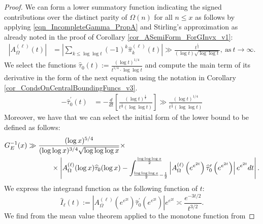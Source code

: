 \documentclass[11pt,reqno,a4letter]{article}
\numberwithin{figure}{section}
\numberwithin{table}{section}
\theoremstyle{plain}
\numberwithin{theorem}{section}
\theoremstyle{definition}
\begin{document}
\begin{proof} 
We can form a lower summatory function indicating the signed contributions over the distinct 
parity of $\Omega(n)$ for all $n \leq x$ as follows by applying 
\eqref{eqn_IncompleteGamma_PropA} and Stirling's approximation as already noted in the 
proof of Corollary \ref{cor_ASemiForm_ForGInvx_v1}: 
\begin{align} 
\label{proof_thm_GInvFunc_v0} 
\left\lvert A_{\Omega}^{(\ell)}(t) \right\rvert & = 
     \left\lvert \sum_{k \leq \log\log t} (-1)^k \widehat{\pi}_k^{(\ell)}(t) \right\rvert 
     \gg 
     \frac{t^{\frac{1}{4}}}{(\log t) \sqrt{\log\log t}}, 
     \mathrm{\ as\ } t \rightarrow \infty. 
\end{align} 
We select the functions 
$\widehat{\tau}_0(t) := \frac{(\log t)^{1/4}}{t^{1/4} \cdot \log\log t}$ and 
compute the main term of its derivative 
in the form of the next equation using 
the notation in Corollary \ref{cor_CondsOnCentralBoundingFuncs_v3}. 
\begin{align} 
\label{eqn_HatTauPrimet_summation_weight_func_exp_v2} 
-\widehat{\tau}_0^{\prime}(t) & = -\frac{d}{dt}\left[ 
     \frac{(\log t)^{\frac{1}{4}}}{t^{\frac{1}{4}} (\log\log t)} 
     \right] \gg \frac{(\log t)^{1/4}}{t^{\frac{5}{4}} (\log\log t)} 
\end{align} 
Moreover, we have that we can select 
the initial form of the lower bound to be defined as follows: 
\begin{align} 
\label{proof_thm_GInvFunc_v1} 
G_{E}^{-1}(x) & \gg 
     \frac{(\log x)^{5/4}}{(\log\log x)^{3/4} \sqrt{\log\log\log x}} \times \\ 
\notag 
     & \phantom{:=\qquad\ } \times 
     \left\lvert A_{\Omega}^{(\ell)}(\log x) \widehat{\tau}_0(\log x) - 
     \int_{\frac{\log\log\log x}{2}-\frac{1}{2}}^{\frac{\log\log\log x}{2}} 
     \left\lvert 
     A_{\Omega}^{(\ell)}\left(e^{e^{2t}}\right) \widehat{\tau}_0^{\prime}\left(e^{e^{2t}}\right) 
     \right\rvert e^{e^{2t}} dt 
     \right\rvert. 
\end{align} 
We express the integrand function as the following function of $t$: 
\begin{equation} 
\label{eqn_proof_thm_GInvFunc_v3v2_approx} 
\widehat{I}_{\ell}(t) := \left\lvert 
     A_{\Omega}^{(\ell)}\left(e^{e^{2t}}\right) \widehat{\tau}_0^{\prime}\left(e^{e^{2t}}\right) 
     \right\rvert e^{e^{2t}} \asymp \frac{e^{-3t/2}}{t^{3/2}}. 
\end{equation} 
We find from the mean value theorem applied to the monotone function from 

\end{proof}
\end{document}
